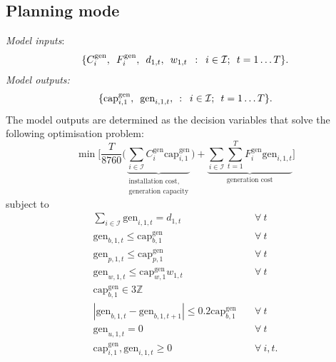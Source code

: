 \documentclass[preprint]{elsarticle}
\begin{document}
\subsection{Planning mode}
\label{sec:appendix:optimisation:model_1}
\noindent \textit{Model inputs}:
\begin{equation}
  \{C_{i}^\text{gen}, \hspace{0.5em} F_{i}^\text{gen}, \hspace{0.5em} d_{1, t}, \hspace{0.5em} w_{1, t} \hspace{0.5em} : \hspace{0.5em} i \in \mathcal{I}; \hspace{0.5em} t = 1 \ldots T\}.
\label{eq:model_1:inputs}
\end{equation}
\textit{Model outputs:}
\begin{equation}
\{\text{cap}_{i,1}^\text{gen}, \hspace{0.5em} \text{gen}_{i,1,t}, \hspace{0.5em} : \hspace{0.5em} i \in \mathcal{I}; \hspace{0.5em} t = 1 \ldots T\}.
\label{eq:model_1:decision_variables}
\end{equation}
The model outputs are determined as the decision variables that solve the following optimisation problem:
\begin{equation}
\min \Bigg[ \frac{T}{8760} \Bigg( \underbrace{\sum_{i \in \mathcal{I}} C_i^\text{gen} \text{cap}_{i,1}^\text{gen}}_{\substack{\text{installation cost,} \\ \text{generation capacity}}} \Bigg) + \underbrace{ \sum_{i \in \mathcal{I}} \sum_{t=1}^{T} F_i^\text{gen} \text{gen}_{i,1,t}}_\text{generation cost} \Bigg]
\label{eq:model_1:objective}
\end{equation}
\noindent subject to
\begin{align}
\sum_{i \in \mathcal{I}} \text{gen}_{i,1,t} = d_{1,t} \quad & \forall \: t \label{eq:model_1:demand_met} \\
\text{gen}_{b,1,t} \le \text{cap}_{b,1}^\text{gen} \quad & \forall \: t \label{eq:model_1:gen_le_cap_b} \\
\text{gen}_{p,1,t} \le \text{cap}_{p,1}^\text{gen} \quad & \forall \: t \label{eq:model_1:gen_le_cap_p} \\
\text{gen}_{w,1,t} \le \text{cap}_{w,1}^\text{gen} w_{1,t} \quad & \forall \: t \label{eq:model_1:gen_le_cap_w} \\
\text{cap}_{b,1}^\text{gen} \in 3\mathbb{Z} \quad & \label{eq:model_1:integer} \\
|\text{gen}_{b,1,t} - \text{gen}_{b,1,t+1}| \le 0.2 \text{cap}_{b,1}^\text{gen} \quad & \forall \: t \label{eq:model_1:ramping} \\
\text{gen}_{u,1,t} = 0 \quad & \forall \: t \label{eq:model_1:no_unmet} \\
\text{cap}_{i,1}^\text{gen}, \text{gen}_{i,1,t} \ge 0 \quad & \forall \: i, t. \label{eq:model_1:ge_0}
\end{align}
\end{document}
